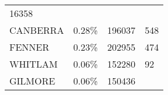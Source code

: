 \documentclass[openany]{book}
\begin{document}
\begin{longtable}[]{@{}llll@{}}
\begin{minipage}[t]{0.40\columnwidth}
16358\strut
\end{minipage}\tabularnewline
\begin{minipage}[t]{0.17\columnwidth}\raggedright
CANBERRA\strut
\end{minipage} & \begin{minipage}[t]{0.10\columnwidth}\raggedright
0.28\%\strut
\end{minipage} & \begin{minipage}[t]{0.22\columnwidth}\raggedright
196037\strut
\end{minipage} & \begin{minipage}[t]{0.40\columnwidth}\raggedright
548\strut
\end{minipage}\tabularnewline
\begin{minipage}[t]{0.17\columnwidth}\raggedright
FENNER\strut
\end{minipage} & \begin{minipage}[t]{0.10\columnwidth}\raggedright
0.23\%\strut
\end{minipage} & \begin{minipage}[t]{0.22\columnwidth}\raggedright
202955\strut
\end{minipage} & \begin{minipage}[t]{0.40\columnwidth}\raggedright
474\strut
\end{minipage}\tabularnewline
\begin{minipage}[t]{0.17\columnwidth}\raggedright
WHITLAM\strut
\end{minipage} & \begin{minipage}[t]{0.10\columnwidth}\raggedright
0.06\%\strut
\end{minipage} & \begin{minipage}[t]{0.22\columnwidth}\raggedright
152280\strut
\end{minipage} & \begin{minipage}[t]{0.40\columnwidth}\raggedright
92\strut
\end{minipage}\tabularnewline
\begin{minipage}[t]{0.17\columnwidth}\raggedright
GILMORE\strut
\end{minipage} & \begin{minipage}[t]{0.10\columnwidth}\raggedright
0.06\%\strut
\end{minipage} & \begin{minipage}[t]{0.22\columnwidth}\raggedright
150436\strut
\end{minipage} & \begin{minipage}[t]{0.40\columnwidth}\raggedright

\end{minipage}
\end{longtable}
\end{document}
